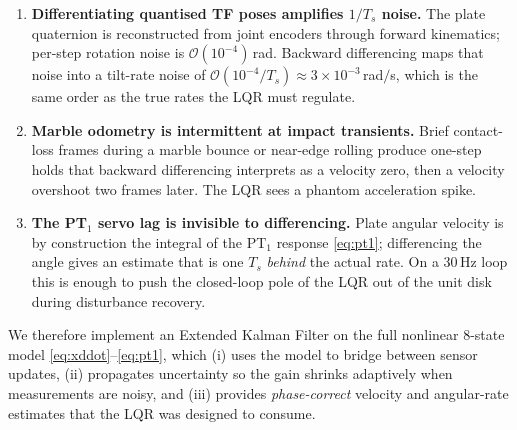 \documentclass[conference]{IEEEtran}
\begin{document}
\begin{enumerate}
  \item \textbf{Differentiating quantised TF poses amplifies $1/T_s$ noise.}
        The plate quaternion is reconstructed from joint encoders through
        forward kinematics; per-step rotation noise is
        $\mathcal{O}(10^{-4})\,$rad. Backward differencing maps that
        noise into a tilt-rate noise of
        $\mathcal{O}(10^{-4}/T_s)\approx 3\!\times\!10^{-3}\,$rad$/$s,
        which is the same order as the true rates the LQR must regulate.
  \item \textbf{Marble odometry is intermittent at impact transients.}
        Brief contact-loss frames during a marble bounce or near-edge
        rolling produce one-step holds that backward differencing
        interprets as a velocity zero, then a velocity overshoot two
        frames later. The LQR sees a phantom acceleration spike.
  \item \textbf{The PT$_1$ servo lag is invisible to differencing.}
        Plate angular velocity is by construction the integral of the PT$_1$
        response \eqref{eq:pt1}; differencing the angle gives an estimate
        that is one $T_s$ \emph{behind} the actual rate. On a $30\,$Hz loop
        this is enough to push the closed-loop pole of the LQR out of the
        unit disk during disturbance recovery.
\end{enumerate}
We therefore implement an Extended Kalman Filter on the full nonlinear
8-state model \eqref{eq:xddot}--\eqref{eq:pt1}, which (i) uses the model
to bridge between sensor updates, (ii) propagates uncertainty so the gain
shrinks adaptively when measurements are noisy, and (iii) provides
\emph{phase-correct} velocity and angular-rate estimates that the LQR was
designed to consume.
\end{document}
